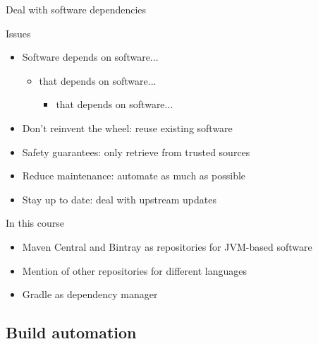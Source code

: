 \documentclass[presentation]{beamer}
\begin{document}
\begin{frame}{Deal with software dependencies}
    \begin{block}{Issues}
        \begin{itemize}
            \item Software depends on software...
            \begin{itemize}
                \item that depends on software...
                \begin{itemize}
                    \item that depends on software...
                \end{itemize}
            \end{itemize}
            \item Don't reinvent the wheel: reuse existing software
            \item Safety guarantees: only retrieve from trusted sources 
            \item Reduce maintenance: automate as much as possible
            \item Stay up to date: deal with upstream updates
        \end{itemize}
    \end{block}
    \begin{block}{In this course}
        \begin{itemize}
            \item Maven Central and Bintray as repositories for JVM-based software
            \item Mention of other repositories for different languages
            \item Gradle as dependency manager
        \end{itemize}
    \end{block}
\end{frame}

\subsection{Build automation}
\end{document}
